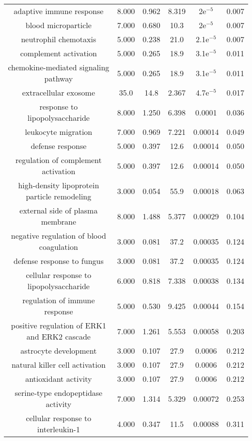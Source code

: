 \documentclass[USLetter,5pt]{article}
\begin{document}
\begin{table}[ht]
\begin{adjustbox}{width = 1\textwidth}
\begin{tabular}{|c|c|c|c|c|c|}
adaptive immune response &  8.000 &  0.962 &  8.319 &   2e$^{-5}$ &  0.007\\
blood microparticle &  7.000 &  0.680 &   10.3 &   2e$^{-5}$ &  0.007\\
neutrophil chemotaxis &  5.000 &  0.238 &   21.0 & 2.1e$^{-5}$ &  0.007\\
complement activation &  5.000 &  0.265 &   18.9 & 3.1e$^{-5}$ &  0.011\\
chemokine-mediated signaling pathway &  5.000 &  0.265 &   18.9 & 3.1e$^{-5}$ &  0.011\\
extracellular exosome &   35.0 &   14.8 &  2.367 & 4.7e$^{-5}$ &  0.017\\
response to lipopolysaccharide &  8.000 &  1.250 &  6.398 & 0.0001 &  0.036\\
leukocyte migration &  7.000 &  0.969 &  7.221 & 0.00014 &  0.049\\
defense response &  5.000 &  0.397 &   12.6 & 0.00014 &  0.050\\
regulation of complement activation &  5.000 &  0.397 &   12.6 & 0.00014 &  0.050\\
high-density lipoprotein particle remodeling &  3.000 &  0.054 &   55.9 & 0.00018 &  0.063\\
external side of plasma membrane &  8.000 &  1.488 &  5.377 & 0.00029 &  0.104\\
negative regulation of blood coagulation &  3.000 &  0.081 &   37.2 & 0.00035 &  0.124\\
defense response to fungus &  3.000 &  0.081 &   37.2 & 0.00035 &  0.124\\
cellular response to lipopolysaccharide &  6.000 &  0.818 &  7.338 & 0.00038 &  0.134\\
regulation of immune response &  5.000 &  0.530 &  9.425 & 0.00044 &  0.154\\
positive regulation of ERK1 and ERK2 cascade &  7.000 &  1.261 &  5.553 & 0.00058 &  0.203\\
astrocyte development &  3.000 &  0.107 &   27.9 & 0.0006 &  0.212\\
natural killer cell activation &  3.000 &  0.107 &   27.9 & 0.0006 &  0.212\\
antioxidant activity &  3.000 &  0.107 &   27.9 & 0.0006 &  0.212\\
serine-type endopeptidase activity &  7.000 &  1.314 &  5.329 & 0.00072 &  0.253\\
cellular response to interleukin-1 &  4.000 &  0.347 &   11.5 & 0.00088 &  0.311\\

\end{tabular}
\end{adjustbox}
\end{table}
\end{document}
